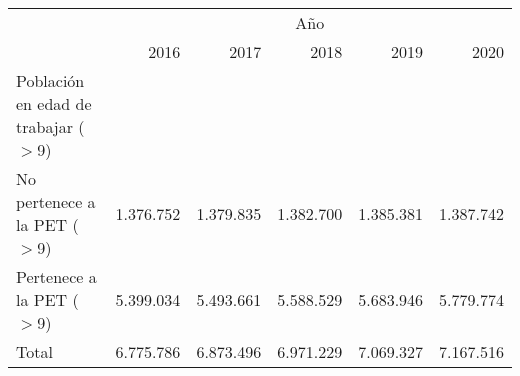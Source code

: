 \begin{tabular}{llllll}
\cline{1-6}
\multicolumn{1}{c}{} &
  \multicolumn{5}{|c}{Año} \\
\multicolumn{1}{c}{} &
  \multicolumn{1}{|r}{2016} &
  \multicolumn{1}{r}{2017} &
  \multicolumn{1}{r}{2018} &
  \multicolumn{1}{r}{2019} &
  \multicolumn{1}{r}{2020} \\
\cline{1-6}
\multicolumn{1}{l}{Población en edad de trabajar ($>$9)} &
  \multicolumn{1}{|r}{} &
  \multicolumn{1}{r}{} &
  \multicolumn{1}{r}{} &
  \multicolumn{1}{r}{} &
  \multicolumn{1}{r}{} \\
\multicolumn{1}{l}{\hspace{1em}No pertenece a la PET ($>$9)} &
  \multicolumn{1}{|r}{1.376.752} &
  \multicolumn{1}{r}{1.379.835} &
  \multicolumn{1}{r}{1.382.700} &
  \multicolumn{1}{r}{1.385.381} &
  \multicolumn{1}{r}{1.387.742} \\
\multicolumn{1}{l}{\hspace{1em}Pertenece a la PET ($>$9)} &
  \multicolumn{1}{|r}{5.399.034} &
  \multicolumn{1}{r}{5.493.661} &
  \multicolumn{1}{r}{5.588.529} &
  \multicolumn{1}{r}{5.683.946} &
  \multicolumn{1}{r}{5.779.774} \\
\multicolumn{1}{l}{\hspace{1em}Total} &
  \multicolumn{1}{|r}{6.775.786} &
  \multicolumn{1}{r}{6.873.496} &
  \multicolumn{1}{r}{6.971.229} &
  \multicolumn{1}{r}{7.069.327} &
  \multicolumn{1}{r}{7.167.516} \\
\cline{1-6}
\end{tabular}
